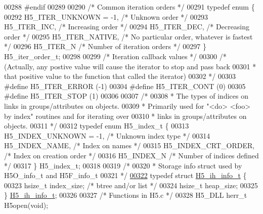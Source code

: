 \begin{DoxyCode}
{{{00288 \textcolor{preprocessor}{#endif}
00289 
00290 \textcolor{comment}{/* Common iteration orders */}
00291 \textcolor{keyword}{typedef} \textcolor{keyword}{enum} \{
00292     H5\_ITER\_UNKNOWN = -1,       \textcolor{comment}{/* Unknown order */}
00293     H5\_ITER\_INC,                \textcolor{comment}{/* Increasing order */}
00294     H5\_ITER\_DEC,                \textcolor{comment}{/* Decreasing order */}
00295     H5\_ITER\_NATIVE,             \textcolor{comment}{/* No particular order, whatever is fastest */}
00296     H5\_ITER\_N               \textcolor{comment}{/* Number of iteration orders */}
00297 \} H5\_iter\_order\_t;
00298 
00299 \textcolor{comment}{/* Iteration callback values */}
00300 \textcolor{comment}{/* (Actually, any postive value will cause the iterator to stop and pass back}
00301 \textcolor{comment}{ *      that positive value to the function that called the iterator)}
00302 \textcolor{comment}{ */}
00303 \textcolor{preprocessor}{#define H5\_ITER\_ERROR   (-1)}
00304 \textcolor{preprocessor}{#define H5\_ITER\_CONT    (0)}
00305 \textcolor{preprocessor}{#define H5\_ITER\_STOP    (1)}
00306 
00307 \textcolor{comment}{/*}
00308 \textcolor{comment}{ * The types of indices on links in groups/attributes on objects.}
00309 \textcolor{comment}{ * Primarily used for "<do> <foo> by index" routines and for iterating over}
00310 \textcolor{comment}{ * links in groups/attributes on objects.}
00311 \textcolor{comment}{ */}
00312 \textcolor{keyword}{typedef} \textcolor{keyword}{enum} H5\_index\_t \{
00313     H5\_INDEX\_UNKNOWN = -1,  \textcolor{comment}{/* Unknown index type           */}
00314     H5\_INDEX\_NAME,      \textcolor{comment}{/* Index on names           */}
00315     H5\_INDEX\_CRT\_ORDER,     \textcolor{comment}{/* Index on creation order      */}
00316     H5\_INDEX\_N          \textcolor{comment}{/* Number of indices defined        */}
00317 \} H5\_index\_t;
00318 
00319 \textcolor{comment}{/*}
00320 \textcolor{comment}{ * Storage info struct used by H5O\_info\_t and H5F\_info\_t}
00321 \textcolor{comment}{ */}
\hyperlink{struct_h5__ih__info__t}{00322} \textcolor{keyword}{typedef} \textcolor{keyword}{struct }\hyperlink{struct_h5__ih__info__t}{H5\_ih\_info\_t} \{
00323     hsize\_t     index\_size;     \textcolor{comment}{/* btree and/or list */}
00324     hsize\_t     heap\_size;
00325 \} \hyperlink{struct_h5__ih__info__t}{H5\_ih\_info\_t};
00326 
00327 \textcolor{comment}{/* Functions in H5.c */}
00328 H5\_DLL herr\_t H5open(\textcolor{keywordtype}{void});
}}}
\end{DoxyCode}
